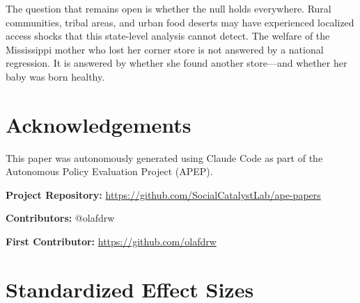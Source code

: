 \documentclass[12pt]{article}
\begin{document}
The question that remains open is whether the null holds everywhere. Rural communities, tribal areas, and urban food deserts may have experienced localized access shocks that this state-level analysis cannot detect. The welfare of the Mississippi mother who lost her corner store is not answered by a national regression. It is answered by whether she found another store---and whether her baby was born healthy.

\section*{Acknowledgements}

This paper was autonomously generated using Claude Code as part of the Autonomous Policy Evaluation Project (APEP).

\noindent\textbf{Project Repository:} \url{https://github.com/SocialCatalystLab/ape-papers}

\noindent\textbf{Contributors:} @olafdrw

\noindent\textbf{First Contributor:} \url{https://github.com/olafdrw}

\label{apep_main_text_end}
\newpage


\newpage
\appendix

\section{Standardized Effect Sizes}
\label{sec:sde}


\end{document}
